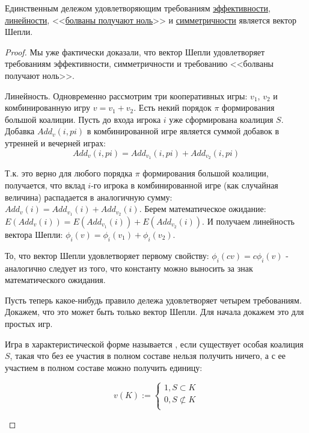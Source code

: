 \begin{myth}
Единственным дележом удовлетворяющим требованиям \hyperref[Pareto]{эффективности}, \hyperref[linearity]{линейности}, <<\hyperref[no_bolvans]{болваны получают ноль}>> и \hyperref[symmetry]{симметричности} является вектор Шепли.
\end{myth}

\begin{proof}
Мы уже фактически доказали, что вектор Шепли удовлетворяет требованиям эффективности, симметричности и требованию <<болваны получают ноль>>. 

Линейность. Одновременно рассмотрим три кооперативных игры: $v_{1}$, $v_{2}$ и комбинированную игру $v=v_{1}+v_{2}$. Есть некий порядок $ \pi $ формирования большой коалиции. Пусть до входа игрока $i$ уже сформирована коалиция $S$. Добавка $Add_{v}(i,pi)$ в комбинированной игре является суммой добавок в утренней и вечерней играх:
\begin{equation}
Add_{v}(i,pi)=Add_{v_{1}}(i,pi)+Add_{v_{2}}(i,pi)
\end{equation}

Т.к. это верно для любого порядка $ \pi $ формирования большой коалиции, получается, что вклад $ i $-го игрока в комбинированной игре (как случайная величина) распадается в аналогичную сумму: $Add_{v}(i)=Add_{v_{1}}(i)+Add_{v_{2}}(i)$. Берем математическое ожидание: $E(Add_{v}(i))=E(Add_{v_{1}}(i))+E(Add_{v_{2}}(i))$. И получаем линейность вектора Шепли: $\phi_{i}(v)=\phi_{i}(v_{1})+\phi_{i}(v_{2})$.

То, что вектор Шепли удовлетворяет первому свойству: $\phi_{i}(cv)=c\phi_{i}(v)$ - аналогично следует из того, что константу можно выносить за знак математического ожидания.

Пусть теперь какое-нибудь правило дележа удовлетворяет четырем требованиям. Докажем, что это может быть только вектор Шепли.
Для начала докажем это для простых игр.

\begin{mydef}
Игра в характеристической форме называется , если существует особая коалиция $S$, такая что без ее участия в полном составе нельзя получить ничего, а с ее участием в полном составе можно получить единицу:

\begin{equation}
v(K):=
\begin{cases} 
1, S\subset K \\  
0, S\not \subset K \\
\end{cases}
\end{equation}


\end{mydef}
\end{proof}
